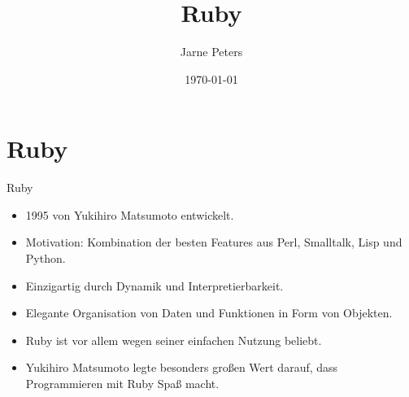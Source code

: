 \documentclass{beamer}
\title{Ruby}
\author{Jarne Peters}
\date{\today}
\begin{document}
\begin{frame}
\titlepage
\end{frame}

\section{Ruby}



\begin{frame}{Ruby}
  \begin{itemize}

    \item 1995 von Yukihiro Matsumoto entwickelt.
    \item Motivation: Kombination der besten Features aus Perl, Smalltalk, Lisp und Python.
    \item Einzigartig durch Dynamik und Interpretierbarkeit.
    \item Elegante Organisation von Daten und Funktionen in Form von Objekten.
    \item Ruby ist vor allem wegen seiner einfachen Nutzung beliebt.
    \item Yukihiro Matsumoto legte besonders großen Wert darauf, dass Programmieren mit Ruby Spaß macht.
  \end{itemize}
\end{frame}
\end{document}
